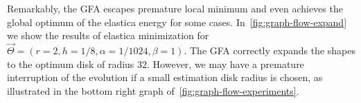 \documentclass[review]{siamart220329}
\begin{document}
Remarkably, the GFA escapes premature local minimum and even achieves the global optimum of the elastica energy for some cases. In~\cref{fig:graph-flow-expand} we show the results of elastica minimization for $\vec{\Theta} = ( r=2,h=1/8,\alpha=1/1024,\beta=1 )$. The GFA correctly expands the shapes to the optimum disk of radius $32$. However, we may have a premature interruption of the evolution if a small estimation disk radius is chosen, as illustrated in the bottom right graph of~\cref{fig:graph-flow-experiments}.
%
%
\begin{figure}
\center
{}\hspace{1.5em}%
\hspace{1.5em}%

\end{figure}
\end{document}
